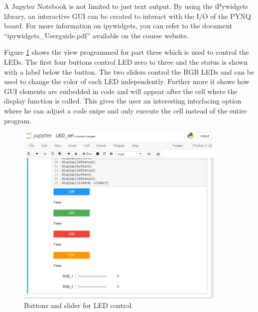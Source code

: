 A Jupyter Notebook is not limited to just text output. By using the iPywidgets library, an interactive GUI can be
created to interact with the I/O of the PYNQ board. For more information on ipywidgets, you can refer to the
document “ipywidgets\_Userguide.pdf” available on the course website.

Figure \ref{fig: part3_screen} shows the view programmed for part three which is used to control the LEDs. The first four buttons control LED zero to three and the status is shown with a label below the button. The two sliders control the RGB LEDs and can be used to change the color of each LED independently. Further more it shows how GUI elements are embedded in code and will appear after the cell where the display function is called. This gives the user an interesting interfacing option where he can adjust a code snipe and only execute the cell instead of the entire program.

\begin{figure}[H]
	\centering
	\includegraphics[width=0.9\textwidth]{01_images/part3_screen.PNG}
	\caption{Buttons and slider for LED control.}
	\label{fig: part3_screen}
\end{figure}

